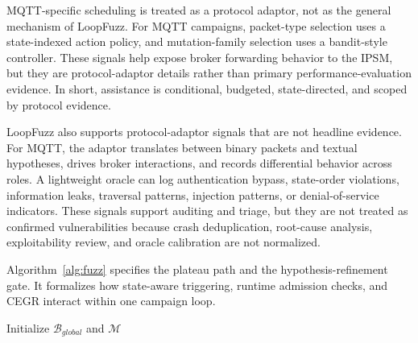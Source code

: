 \documentclass[final,5p,times,number]{elsarticle}
\begin{document}
MQTT-specific scheduling is treated as a protocol adaptor, not as the general mechanism of LoopFuzz. For MQTT campaigns, packet-type selection uses a state-indexed action policy, and mutation-family selection uses a bandit-style controller. These signals help expose broker forwarding behavior to the IPSM, but they are protocol-adaptor details rather than primary performance-evaluation evidence. In short, assistance is conditional, budgeted, state-directed, and scoped by protocol evidence.

LoopFuzz also supports protocol-adaptor signals that are not headline evidence. For MQTT, the adaptor translates between binary packets and textual hypotheses, drives broker interactions, and records differential behavior across roles. A lightweight oracle can log authentication bypass, state-order violations, information leaks, traversal patterns, injection patterns, or denial-of-service indicators. These signals support auditing and triage, but they are not treated as confirmed vulnerabilities because crash deduplication, root-cause analysis, exploitability review, and oracle calibration are not normalized.

Algorithm~\ref{alg:fuzz} specifies the plateau path and the hypothesis-refinement gate. It formalizes how state-aware triggering, runtime admission checks, and CEGR interact within one campaign loop.

\begin{algorithm}[!tbp]
\caption{Runtime-Validated Plateau Recovery in LoopFuzz}
\label{alg:fuzz}
\SetAlgoLined
{}
\footnotesize
\DontPrintSemicolon
{}
Initialize $\mathcal{B}_{global}$ and $\mathcal{M}$\;
\end{algorithm}
\end{document}

